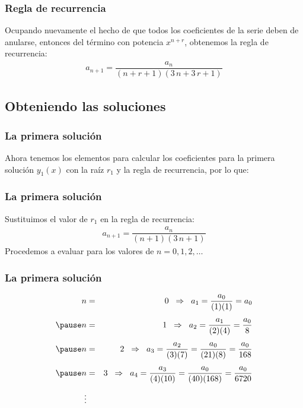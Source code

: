 \begin{frame}
\frametitle{Regla de recurrencia}
Ocupando nuevamente el hecho de que todos los coeficientes de la serie deben de anularse, entonces del término con potencia $x^{n+r}$, obtenemos la regla de recurrencia:
\begin{align*}
a_{n+1} = \dfrac{a_{n}}{(n + r + 1)(3 \, n+ 3 \, r + 1)}
\end{align*}
\end{frame}
\subsection{Obteniendo las soluciones}
\begin{frame}
\frametitle{La primera solución}
Ahora tenemos los elementos para calcular los coeficientes para la primera solución $y_{1}(x)$ con la raíz $r_{1}$ y la regla de recurrencia, por lo que:
\end{frame}
\begin{frame}
\frametitle{La primera solución}
Sustituimos el valor de $r_{1}$ en la regla de recurrencia:
\begin{align*}
a_{n+1} = \dfrac{a_{n}}{(n+1)(3 \, n +1)}
\end{align*}
\pause
Procedemos a evaluar para los valores de $n = 0, 1, 2, \ldots$
\end{frame}
\begin{frame}
\frametitle{La primera solución}
\begin{eqnarray*}
n &=& 0 \hspace{0.2cm} \Rightarrow \hspace{0.2cm} a_{1} = \dfrac{a_{0}}{(1)(1)} = a_{0} \\[0.45em] \pause
n &=& 1 \hspace{0.2cm} \Rightarrow \hspace{0.2cm} a_{2} = \dfrac{a_{1}}{(2)(4)} = \dfrac{a_{0}}{8} \\[0.45em] \pause
n &=& 2 \hspace{0.2cm} \Rightarrow \hspace{0.2cm} a_{3} = \dfrac{a_{2}}{(3)(7)} = \dfrac{a_{0}}{(21)(8)} = \dfrac{a_{0}}{168} \\[0.45em] \pause
n &=& 3 \hspace{0.2cm} \Rightarrow \hspace{0.2cm} a_{4} = \dfrac{a_{3}}{(4)(10)} = \dfrac{a_{0}}{(40)(168)} = \dfrac{a_{0}}{6720} \\[0.45em]
\vdots
\end{eqnarray*}
\end{frame}
